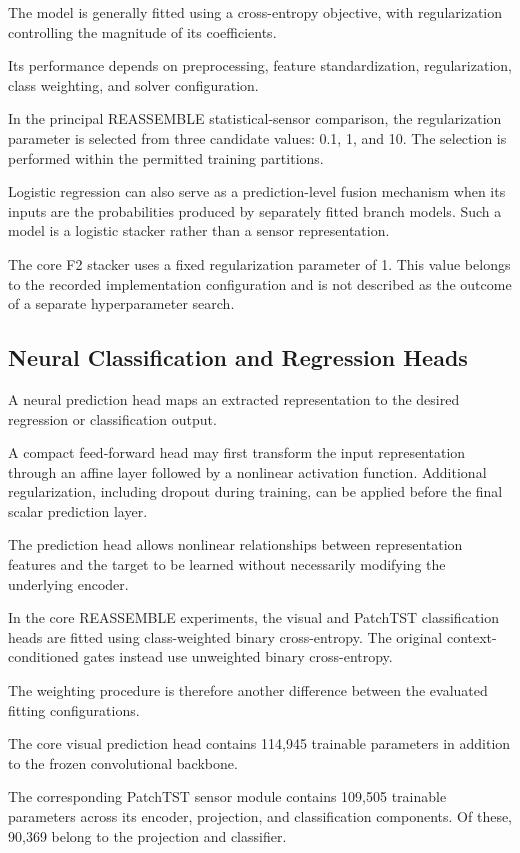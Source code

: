 The model is generally fitted using a cross-entropy objective, with regularization controlling the magnitude of its coefficients.

Its performance depends on preprocessing, feature standardization, regularization, class weighting, and solver configuration.

In the principal REASSEMBLE statistical-sensor comparison, the regularization parameter is selected from three candidate values: 0.1, 1, and 10. The selection is performed within the permitted training partitions.

Logistic regression can also serve as a prediction-level fusion mechanism when its inputs are the probabilities produced by separately fitted branch models. Such a model is a logistic stacker rather than a sensor representation.

The core F2 stacker uses a fixed regularization parameter of 1. This value belongs to the recorded implementation configuration and is not described as the outcome of a separate hyperparameter search.

\subsection{Neural Classification and Regression Heads}

A neural prediction head maps an extracted representation to the desired regression or classification output.

A compact feed-forward head may first transform the input representation through an affine layer followed by a nonlinear activation function. Additional regularization, including dropout during training, can be applied before the final scalar prediction layer.

The prediction head allows nonlinear relationships between representation features and the target to be learned without necessarily modifying the underlying encoder.

In the core REASSEMBLE experiments, the visual and PatchTST classification heads are fitted using class-weighted binary cross-entropy. The original context-conditioned gates instead use unweighted binary cross-entropy.

The weighting procedure is therefore another difference between the evaluated fitting configurations.

The core visual prediction head contains 114,945 trainable parameters in addition to the frozen convolutional backbone.

The corresponding PatchTST sensor module contains 109,505 trainable parameters across its encoder, projection, and classification components. Of these, 90,369 belong to the projection and classifier.

